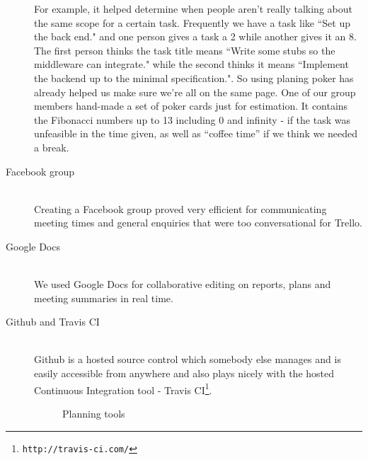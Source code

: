 \documentclass[11pt, a4paper]{article}
\begin{document}
\begin{description}
For example, it helped determine when people aren't really talking about the same scope for a certain task. Frequently we have a task like ``Set up the back end." and one person gives a task a 2 while another gives it an 8. The first person thinks the task title means ``Write some stubs so the middleware can integrate." while the second thinks it means ``Implement the backend up to the minimal specification.". So using planing poker has already helped us make sure we're all on the same page. One of our group members hand-made a set of poker cards just for estimation. It contains the Fibonacci numbers up to 13 including 0 and infinity - if the task was unfeasible in the time given, as well as ``coffee time'' if we think we needed a break. 

  \item[Facebook group] \hfill \\
  Creating a Facebook group proved very efficient for communicating meeting times and general enquiries that were too conversational for Trello.  

  \item[Google Docs] \hfill \\
  We used Google Docs for collaborative editing on reports, plans and meeting summaries in real time.
  \item[Github and Travis CI] \hfill \\
  Github is a hosted source control which somebody else manages and is easily accessible from anywhere and also plays nicely with the hosted Continuous Integration tool - Travis CI\footnote{\tt{http://travis-ci.com/}}.


\begin{figure}[ht]
\centering
{}
\quad
{}
\caption{Planning tools}
\label{fig:figure}
\end{figure}

\end{description}


\end{document}
